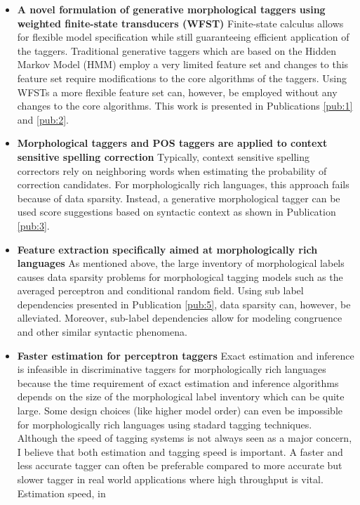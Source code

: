 \begin{itemize}
\item {\bf A novel formulation of generative morphological taggers
    using weighted finite-state transducers (WFST)} Finite-state
  calculus allows for flexible model specification while still
  guaranteeing efficient application of the taggers. Traditional
  generative taggers which are based on the Hidden Markov Model (HMM)
  employ a very limited feature set and changes to this feature set
  require modifications to the core algorithms of the taggers. Using
  WFSTs a more flexible feature set can, however, be employed without
  any changes to the core algorithms. This work is presented in
  Publications \ref{pub:1} and \ref{pub:2}.
\item {\bf Morphological taggers and POS taggers are applied to context
  sensitive spelling correction} Typically, context sensitive spelling
  correctors rely on neighboring words when estimating the probability
  of correction candidates. For morphologically rich languages, this
  approach fails because of data sparsity. Instead, a generative
  morphological tagger can be used score suggestions based on
  syntactic context as shown in Publication \ref{pub:3}.
\item {\bf Feature extraction specifically aimed at morphologically
    rich languages} As mentioned above, the large inventory of
  morphological labels causes data sparsity problems for morphological
  tagging models such as the averaged perceptron and conditional
  random field. Using sub label dependencies presented in Publication \ref{pub:5},
  data sparsity can, however, be alleviated. Moreover, sub-label
  dependencies allow for modeling congruence and other similar
  syntactic phenomena.
\item {\bf Faster estimation for perceptron taggers} Exact estimation
  and inference is infeasible in discriminative taggers for
  morphologically rich languages because the time requirement of exact
  estimation and inference algorithms depends on the size of the
  morphological label inventory which can be quite large. Some design
  choices (like higher model order) can even be impossible for
  morphologically rich languages using stadard tagging
  techniques. Although the speed of tagging systems is not always seen
  as a major concern, I believe that both estimation and tagging speed
  is important. A faster and less accurate tagger can often be
  preferable compared to more accurate but slower tagger in real world
  applications where high throughput is vital. Estimation speed, in

\end{itemize}
